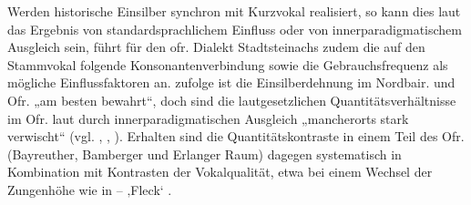 Werden historische Einsilber synchron mit Kurzvokal realisiert, so kann dies laut \citet[70]{Rowley1997} das Ergebnis von standardsprachlichem Einfluss oder von innerparadigmatischem Ausgleich sein, \citet[132--133]{Schübel1955} führt für den ofr. Dialekt Stadtsteinachs zudem die auf den Stammvokal folgende Konsonantenverbindung sowie die Gebrauchsfrequenz als mögliche Einflussfaktoren an. \citet[§34k5]{Kranzmayer1956} zufolge ist die Einsilberdehnung im Nordbair. und Ofr. „am besten bewahrt“, doch sind die lautgesetzlichen Quantitätsverhältnisse im Ofr. laut \citet[71]{Rowley1997} durch innerparadigmatischen Ausgleich „mancherorts stark verwischt“ (vgl. \citealt[70--71]{Heilig1898}, \citealt[1]{Heinebrodt1963}, \citealt[Karte 22]{Kranzmayer1956}). Erhalten sind die Quantitätskontraste in einem Teil des Ofr. (Bayreuther, Bamberger und Erlanger Raum) dagegen systematisch in Kombination mit Kontrasten der Vokalqualität, etwa bei einem Wechsel der Zungenhöhe wie in  --  ‚Fleck‘ \citep[194]{Rowley1997}.

